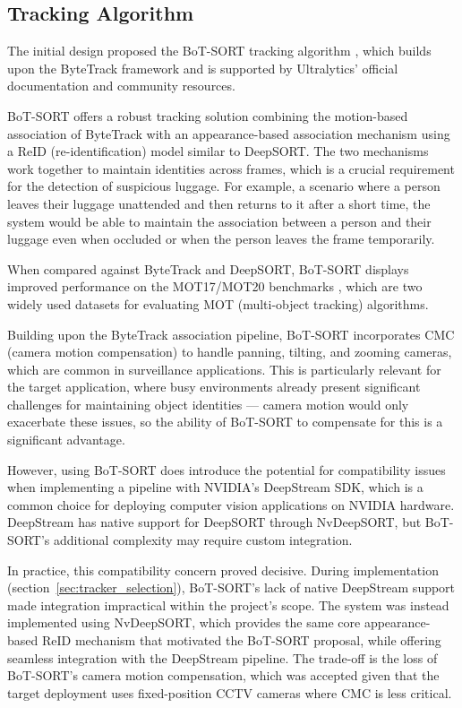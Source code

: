 \subsection{Tracking Algorithm}

The initial design proposed the BoT-SORT tracking algorithm
\citep{aharon2022bot}, which builds upon the ByteTrack framework and is
supported by Ultralytics' official documentation and community resources.

BoT-SORT offers a robust tracking solution combining the motion-based
association of ByteTrack with an appearance-based association mechanism using a
ReID (re-identification) model similar to DeepSORT. The two mechanisms work
together to maintain identities across frames, which is a crucial requirement
for the detection of suspicious luggage. For example, a scenario where a person
leaves their luggage unattended and then returns to it after a short time, the
system would be able to maintain the association between a person and their
luggage even when occluded or when the person leaves the frame temporarily.

When compared against ByteTrack and DeepSORT, BoT-SORT displays improved
performance on the MOT17/MOT20 benchmarks \citep{aharon2022bot}, which are two
widely used datasets for evaluating MOT (multi-object tracking) algorithms.

Building upon the ByteTrack association pipeline, BoT-SORT incorporates CMC
(camera motion compensation) to handle panning, tilting, and zooming cameras,
which are common in surveillance applications. This is particularly relevant
for the target application, where busy environments already present significant
challenges for maintaining object identities --- camera motion would only
exacerbate these issues, so the ability of BoT-SORT to compensate for this is a
significant advantage.

However, using BoT-SORT does introduce the potential for compatibility issues
when implementing a pipeline with NVIDIA's DeepStream SDK, which is a common
choice for deploying computer vision applications on NVIDIA hardware.
DeepStream has native support for DeepSORT through NvDeepSORT, but BoT-SORT's
additional complexity may require custom integration.

In practice, this compatibility concern proved decisive. During implementation
(section~\ref{sec:tracker_selection}), BoT-SORT's lack of native DeepStream
support made integration impractical within the project's scope. The system was
instead implemented using NvDeepSORT, which provides the same core
appearance-based ReID mechanism that motivated the BoT-SORT proposal, while
offering seamless integration with the DeepStream pipeline. The trade-off is
the loss of BoT-SORT's camera motion compensation, which was accepted given
that the target deployment uses fixed-position CCTV cameras where CMC is less
critical.

